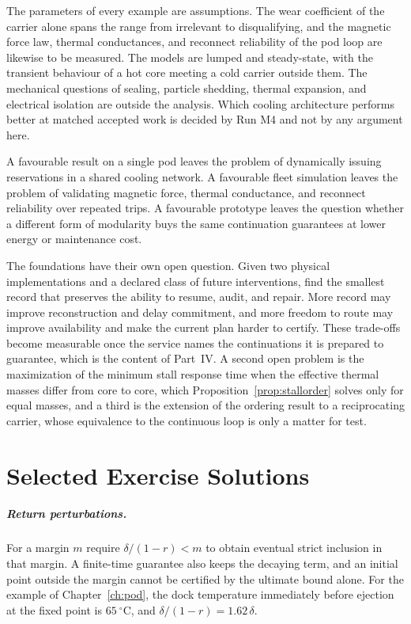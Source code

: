 \documentclass[11pt,openany]{book}
\theoremstyle{plain}
\theoremstyle{definition}
\theoremstyle{remark}
\begin{document}
The parameters of every example are assumptions. The wear coefficient of the carrier alone spans the range from irrelevant to disqualifying, and the magnetic force law, thermal conductances, and reconnect reliability of the pod loop are likewise to be measured. The models are lumped and steady-state, with the transient behaviour of a hot core meeting a cold carrier outside them. The mechanical questions of sealing, particle shedding, thermal expansion, and electrical isolation are outside the analysis. Which cooling architecture performs better at matched accepted work is decided by Run M4 and not by any argument here.

A favourable result on a single pod leaves the problem of dynamically issuing reservations in a shared cooling network. A favourable fleet simulation leaves the problem of validating magnetic force, thermal conductance, and reconnect reliability over repeated trips. A favourable prototype leaves the question whether a different form of modularity buys the same continuation guarantees at lower energy or maintenance cost.

The foundations have their own open question. Given two physical implementations and a declared class of future interventions, find the smallest record that preserves the ability to resume, audit, and repair. More record may improve reconstruction and delay commitment, and more freedom to route may improve availability and make the current plan harder to certify. These trade-offs become measurable once the service names the continuations it is prepared to guarantee, which is the content of Part~IV. A second open problem is the maximization of the minimum stall response time when the effective thermal masses differ from core to core, which Proposition~\ref{prop:stallorder} solves only for equal masses, and a third is the extension of the ordering result to a reciprocating carrier, whose equivalence to the continuous loop is only a matter for test.

\appendix
\chapter{Selected Exercise Solutions}

\paragraph{Return perturbations.} For a margin $m$ require $\delta/(1-r)<m$ to obtain eventual strict inclusion in that margin. A finite-time guarantee also keeps the decaying term, and an initial point outside the margin cannot be certified by the ultimate bound alone. For the example of Chapter~\ref{ch:pod}, the dock temperature immediately before ejection at the fixed point is $65\ ^\circ$C, and $\delta/(1-r)=1.62\,\delta$.
\end{document}
